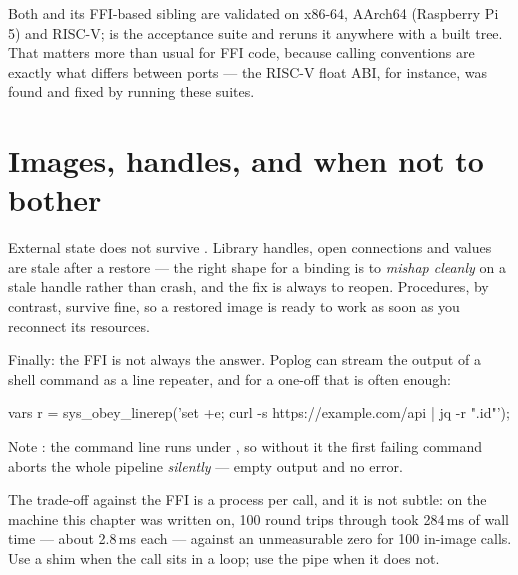 Both  and its FFI-based sibling  are validated
on x86-64, AArch64 (Raspberry Pi 5) and RISC-V; 
is the acceptance suite and  reruns it
anywhere with a built tree. That matters more than usual for FFI code,
because calling conventions are exactly what differs between ports --- the
RISC-V float ABI, for instance, was found and fixed by running these suites.

\section{Images, handles, and when not to bother}

External state does not survive . Library handles, open
connections and  values are stale after a restore --- the right
shape for a binding is to \emph{mishap cleanly} on a stale handle rather than
crash, and the fix is always to reopen. Procedures, by contrast, survive
fine, so a restored image is ready to work as soon as you reconnect its
resources.

Finally: the FFI is not always the answer. Poplog can stream the output of a
shell command as a line repeater, and for a one-off that is often enough:

\begin{pop}
vars r = sys_obey_linerep('set +e; curl -s https://example.com/api | jq -r ".id"');
\end{pop}

Note : the command line runs under , so without it
the first failing command aborts the whole pipeline \emph{silently} --- empty
output and no error.

The trade-off against the FFI is a process per call, and it is not subtle: on
the machine this chapter was written on, 100 round trips through
 took 284\,ms of wall time --- about
2.8\,ms each --- against an unmeasurable zero for 100 in-image calls. Use a
shim when the call sits in a loop; use the pipe when it does not.
